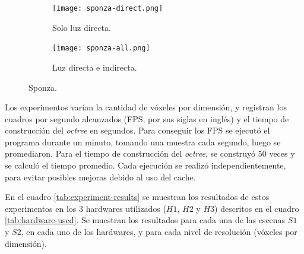 \begin{figure}[H]
	\begin{subfigure}{0.49\textwidth}
	  \centering
	  \texttt{[image: sponza-direct.png]}
	  \caption{Solo luz directa.}
	\end{subfigure}
	\begin{subfigure}{0.49\textwidth}
	  \centering
	  \texttt{[image: sponza-all.png]}
	  \caption{Luz directa e indirecta.}
	\end{subfigure}
	\caption{Sponza.}
	\label{fig:sponza}
\end{figure}

Los experimentos varían la cantidad de vóxeles por dimensión, y registran los cuadros por segundo alcanzados (FPS, por sus siglas en inglés) y el tiempo de construcción del \textit{octree} en segundos.
Para conseguir los FPS se ejecutó el programa durante un minuto, tomando una muestra cada segundo, luego se promediaron.
Para el tiempo de construcción del \textit{octree}, se construyó 50 veces y se calculó el tiempo promedio.
Cada ejecución se realizó independientemente, para evitar posibles mejoras debido al uso del cache.

En el cuadro \ref{tab:experiment-results} se muestran los resultados de estos experimentos en los 3 hardwares utilizados ($H1$, $H2$ y $H3$) descritos en el cuadro \ref{tab:hardware-used}.
Se muestran los resultados para cada una de las escenas $S1$ y $S2$, en cada uno de los hardwares, y para cada nivel de resolución (vóxeles por dimensión).

